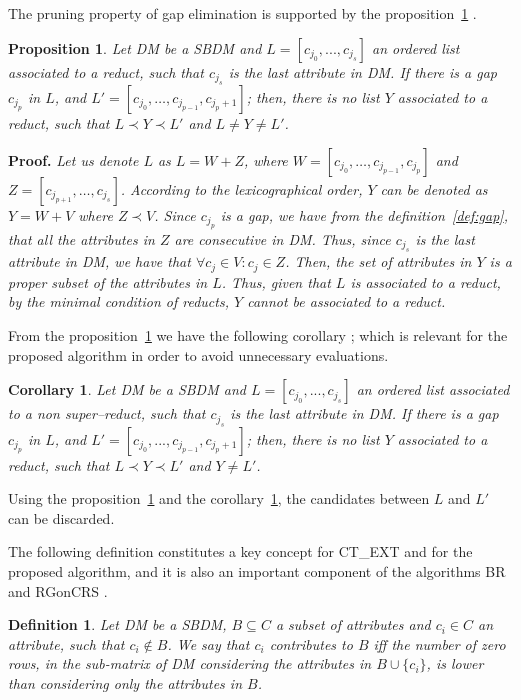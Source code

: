 \documentclass[authoryear,preprint,review,12pt]{elsarticle}
\newtheorem{proposition}{Proposition}
\newtheorem{definition}{Definition}
\newtheorem{corollary}{Corollary}
\begin{document}
	The pruning property of gap elimination is supported by the proposition~\ref{prop:gap} \citep{Santiesteban03}. 
		
	\begin{proposition}\label{prop:gap} 
		Let DM be a SBDM and $L = [c_{j_0},...,c_{j_s}]$ an ordered list associated to a reduct, such that $c_{j_s}$ is the last attribute in DM. If there is a gap $c_{j_p}$ in $L$, and $L'=[c_{j_0},\dots,c_{j_{p-1}},c_{j_p+1}]$; then, there is no list $Y$ associated to a reduct, such that $L \prec Y \prec L'$ and $L \neq Y \neq L'$.
	\end{proposition}	
	
	\noindent
	\textbf{Proof.} \textit{\label{proof:gap} 
	Let us denote $L$ as $L=W+Z$, where $W=[c_{j_0},\dots,c_{j_{p-1}}, c_{j_p}]$ and $Z=[c_{j_{p+1}}, \dots, c_{j_s}]$. According to the lexicographical order, $Y$ can be denoted as $Y=W+V$ where $Z \prec V$. Since $c_{j_p}$ is a gap, we have from the definition~\ref{def:gap}, that all the attributes in $Z$ are consecutive in DM. Thus, since $c_{j_s}$ is the last attribute in DM, we have that $\forall c_j \in V: c_j \in Z$. Then, the set of attributes in $Y$ is a proper subset of the attributes in $L$. Thus, given that $L$ is associated to a reduct, by the minimal condition of reducts, $Y$ cannot be associated to a reduct.}
	
	From the proposition~\ref{prop:gap} we have the following corollary \citep{Santiesteban03}; which is relevant for the proposed algorithm in order to avoid unnecessary evaluations.
	
	\begin{corollary}\label{coro:gap} 
		Let DM be a SBDM and $L = [c_{j_0},...,c_{j_s}]$ an ordered list associated to a non super--reduct, such that $c_{j_s}$ is the last attribute in DM. If there is a gap $c_{j_p}$ in $L$, and $L' = [c_{j_0},...,c_{j_{p-1}},c_{j_p+1}]$; then, there is no list $Y$ associated to a reduct, such that $L \prec Y \prec L'$ and $Y \neq L'$.
	\end{corollary}
	
	Using the proposition~\ref{prop:gap} and the corollary~\ref{coro:gap}, the candidates between $L$ and $L'$ can be discarded.
		
	The following definition constitutes a key concept for CT\_EXT \citep{Sanchez07} and for the proposed algorithm, and it is also an important component of the algorithms BR \citep{Lias09} and RGonCRS \citep{WangP07}.
			
	\begin{definition}\label{def:contrib}
		Let DM be a SBDM, $B \subseteq C$ a subset of attributes and  $c_i \in C$ an attribute, such that $c_i \notin B$. We say that $c_i$ contributes to $B$ iff the	number of zero rows, in the sub-matrix of DM considering the attributes in $B\cup\{c_i\}$, is lower than considering only the attributes in $B$.
	\end{definition}
			
\end{document}
